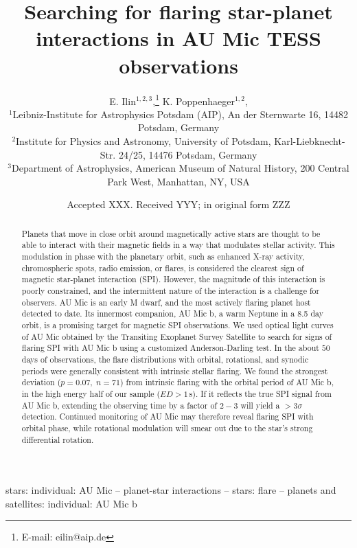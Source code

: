 \documentclass[fleqn,usenatbib]{mnras}%
\title[Flaring SPI in AU Mic]{Searching for flaring star-planet interactions in AU Mic TESS observations}
\author[E. Ilin et al.]{
E. Ilin$^{1,2,3}$,\thanks{E-mail: eilin@aip.de}
K. Poppenhaeger$^{1,2}$,
\\
$^{1}$Leibniz-Institute for Astrophysics Potsdam (AIP), An der Sternwarte 16, 14482 Potsdam, Germany\\
$^{2}$Institute for Physics and Astronomy, University of Potsdam, Karl-Liebknecht-Str. 24/25, 14476 Potsdam, Germany\\
$^{3}$Department of Astrophysics, American Museum of Natural History, 200 Central Park West, Manhattan, NY, USA\\
}
\date{Accepted XXX. Received YYY; in original form ZZZ}
\begin{document}
\label{firstpage}
\pagerange{\pageref{firstpage}--\pageref{lastpage}}
\maketitle

\begin{abstract}
Planets that move in close orbit around magnetically active stars are thought to be able to interact with their magnetic fields in a way that modulates stellar activity. This modulation in phase with the planetary orbit, such as enhanced X-ray activity, chromospheric spots, radio emission, or flares, is considered the clearest sign of magnetic star-planet interaction (SPI). However, the magnitude of this interaction is poorly constrained, and the intermittent nature of the interaction is a challenge for observers. AU Mic is an early M dwarf, and the most actively flaring planet host detected to date. Its innermost companion, AU Mic b, a warm Neptune in a 8.5 day orbit, is a promising target for magnetic SPI observations. We used optical light curves of AU Mic obtained by the Transiting Exoplanet Survey Satellite to search for signs of flaring SPI with AU Mic b using a customized Anderson-Darling test. In the about $50$ days of observations, the flare distributions with orbital, rotational, and synodic periods were generally consistent with intrinsic stellar flaring. We found the strongest deviation ($p=0.07,\;n=71$) from intrinsic flaring with the orbital period of AU Mic b, in the high energy half of our sample ($ED>1$\,s). If it reflects the true SPI signal from AU Mic b, extending the observing time by a factor of $2-3$ will yield a $>3\sigma$ detection. Continued monitoring of AU Mic may therefore reveal flaring SPI with orbital phase, while rotational modulation will smear out due to the star's strong differential rotation.
\end{abstract}

\begin{keywords}
stars: individual: AU Mic -- planet-star interactions -- stars: flare -- planets and satellites: individual: AU Mic b
\end{keywords}

%
\end{document}
